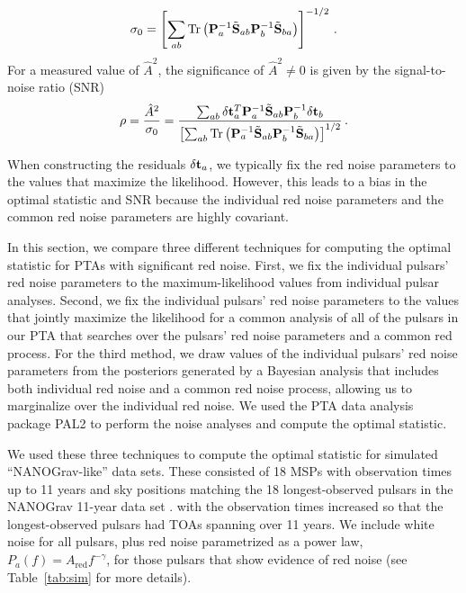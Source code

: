 \documentclass[twocolumn,aps,prd,superscriptaddress]{revtex4-1}
\DeclareMathOperator{\Tr}{Tr}
\newcommand{\Agw}{\ensuremath{A_\mathrm{gw}}}
\newcommand{\res}{\ensuremath{\delta {\bf t}}}
\begin{document}
\begin{equation}
	\sigma_0 = \left[ \sum_{ab} \Tr \left( {\bf{P}}_a^{-1} \tilde{{\bf{S}}}_{ab} {\bf{P}}_b^{-1} \tilde{{\bf{S}}}_{ba} \right) \right]^{-1/2} \,.
\end{equation}
For a measured value of $\hat{A}^2$, 
the significance of $\hat{A}^2 \neq 0$ is given by the signal-to-noise ratio (SNR) 
\begin{equation}
	\rho = \frac{\hat{A}^2}{\sigma_0} = \frac{\sum_{ab} \res_a^T {\bf{P}}_a^{-1} \tilde{{\bf{S}}}_{ab} {\bf{P}}_b^{-1} \res_b}{\left[ \sum_{ab} \Tr \left( {\bf{P}}_a^{-1} \tilde{{\bf{S}}}_{ab} {\bf{P}}_b^{-1} \tilde{{\bf{S}}}_{ba} \right) \right]^{1/2}} \,.
\end{equation}

When constructing the residuals $\res_a$, 
we typically fix the red noise parameters to the values that 
maximize the likelihood. 
However, this leads to a bias in the optimal statistic and SNR because 
the individual red noise parameters and the common red noise parameters 
are highly covariant. 

In this section, we compare three different techniques for computing the 
optimal statistic for PTAs with significant red noise. 
First, we fix the individual pulsars' red noise parameters to the 
maximum-likelihood values from individual pulsar analyses. 
Second, we fix the individual pulsars' red noise parameters to the 
values that jointly maximize the likelihood for a common analysis 
of all of the pulsars in our PTA 
that searches over the pulsars' red noise parameters and 
a common red process. 
For the third method, we draw values of the individual pulsars' 
red noise parameters from the posteriors generated by a Bayesian analysis 
that includes both individual red noise and a common red noise process, 
allowing us to marginalize over the individual red noise. 
We used the PTA data analysis package 
PAL2 %
\citep{evh17a}
to perform the noise analyses and compute the optimal statistic.

We used these three techniques to compute the optimal statistic 
for simulated ``NANOGrav-like'' data sets. 
These consisted of 18 MSPs with observation times up to 11 years 
and sky positions matching the 18 longest-observed pulsars in the 
NANOGrav 11-year data set \citep{abb+17}.
with the observation times increased so that the longest-observed pulsars 
had TOAs spanning over 11 years. 
We include white noise for all pulsars, plus 
red noise parametrized as a power law, $P_a(f) = A_\mathrm{red} f^{-\gamma}$, 
for those pulsars that show evidence of red noise 
(see Table~\ref{tab:sim} for more details).
\end{document}
